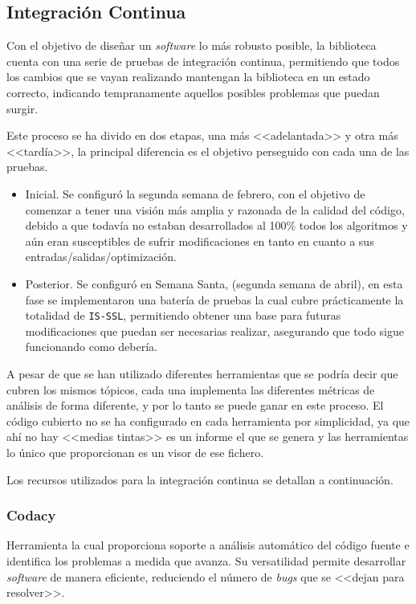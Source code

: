 \subsection{Integración Continua}
Con el objetivo de diseñar un \textit{software} lo más robusto posible, la biblioteca cuenta con una serie de pruebas de integración continua, permitiendo que todos los cambios que se vayan realizando mantengan la biblioteca en un estado correcto, indicando tempranamente aquellos posibles problemas que puedan surgir.

Este proceso se ha divido en dos etapas, una más <<adelantada>> y otra más <<tardía>>, la principal diferencia es el objetivo perseguido con cada una de las pruebas. 
\begin{itemize}
\item Inicial. Se configuró la segunda semana de febrero, con el objetivo de comenzar a tener una visión más amplia y razonada de la calidad del código, debido a que todavía no estaban desarrollados al 100\% todos los algoritmos y aún eran susceptibles de sufrir modificaciones en tanto en cuanto a sus entradas/salidas/optimización. 
\item Posterior. Se configuró en Semana Santa, (segunda semana de abril), en esta fase se implementaron una batería de pruebas la cual cubre prácticamente la totalidad de \texttt{IS-SSL}, permitiendo obtener una base para futuras modificaciones que puedan ser necesarias realizar, asegurando que todo sigue funcionando como debería.
\end{itemize}

A pesar de que se han utilizado diferentes herramientas que se podría decir que cubren los mismos tópicos, cada una implementa las diferentes métricas de análisis de forma diferente, y por lo tanto se puede ganar en este proceso. El código cubierto no se ha configurado en cada herramienta por simplicidad, ya que ahí no hay <<medias tintas>> es un informe el que se genera y las herramientas lo único que proporcionan es un visor de ese fichero.

Los recursos utilizados para la integración continua se detallan a continuación.

\subsubsection{Codacy}
Herramienta la cual proporciona soporte a análisis automático del código fuente e identifica los problemas a medida que avanza. Su versatilidad permite desarrollar \textit{software} de manera eficiente, reduciendo el número de \textit{bugs} que se <<dejan para resolver>>. 

